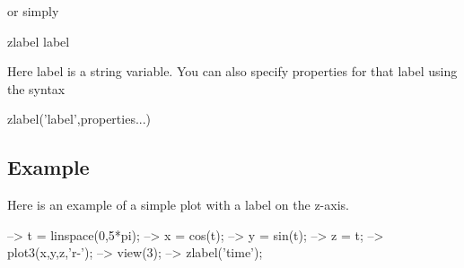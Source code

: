  or simply \begin{DoxyVerb}  zlabel label
\end{DoxyVerb}
 Here {\ttfamily label} is a string variable. You can also specify properties for that label using the syntax \begin{DoxyVerb}  zlabel('label',properties...) 
\end{DoxyVerb}
 \hypertarget{variables_struct_Example}{}\subsection{Example}\label{variables_struct_Example}
Here is an example of a simple plot with a label on the {\ttfamily z}-\/axis.


\begin{DoxyVerbInclude}
--> t = linspace(0,5*pi);
--> x = cos(t);
--> y = sin(t);
--> z = t;
--> plot3(x,y,z,'r-');
--> view(3);
--> zlabel('time');
\end{DoxyVerbInclude}


